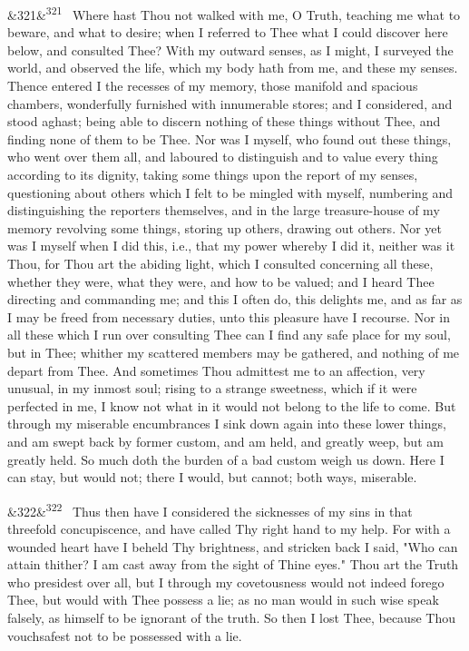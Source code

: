 \documentclass[12pt]{article}
\newcommand{\para}[1][]{\par\noindent\ifx&#1&\else\textsuperscript{\footnotesize #1}~\fi}
\begin{document}
\para[321] Where hast Thou not walked with me, O Truth, teaching me what to beware, and what to desire; when I referred to Thee what I could discover here below, and consulted Thee? With my outward senses, as I might, I surveyed the world, and observed the life, which my body hath from me, and these my senses. Thence entered I the recesses of my memory, those manifold and spacious chambers, wonderfully furnished with innumerable stores; and I considered, and stood aghast; being able to discern nothing of these things without Thee, and finding none of them to be Thee. Nor was I myself, who found out these things, who went over them all, and laboured to distinguish and to value every thing according to its dignity, taking some things upon the report of my senses, questioning about others which I felt to be mingled with myself, numbering and distinguishing the reporters themselves, and in the large treasure-house of my memory revolving some things, storing up others, drawing out others. Nor yet was I myself when I did this, i.e., that my power whereby I did it, neither was it Thou, for Thou art the abiding light, which I consulted concerning all these, whether they were, what they were, and how to be valued; and I heard Thee directing and commanding me; and this I often do, this delights me, and as far as I may be freed from necessary duties, unto this pleasure have I recourse. Nor in all these which I run over consulting Thee can I find any safe place for my soul, but in Thee; whither my scattered members may be gathered, and nothing of me depart from Thee. And sometimes Thou admittest me to an affection, very unusual, in my inmost soul; rising to a strange sweetness, which if it were perfected in me, I know not what in it would not belong to the life to come. But through my miserable encumbrances I sink down again into these lower things, and am swept back by former custom, and am held, and greatly weep, but am greatly held. So much doth the burden of a bad custom weigh us down. Here I can stay, but would not; there I would, but cannot; both ways, miserable.

\para[322] Thus then have I considered the sicknesses of my sins in that threefold concupiscence, and have called Thy right hand to my help. For with a wounded heart have I beheld Thy brightness, and stricken back I said, "Who can attain thither? I am cast away from the sight of Thine eyes." Thou art the Truth who presidest over all, but I through my covetousness would not indeed forego Thee, but would with Thee possess a lie; as no man would in such wise speak falsely, as himself to be ignorant of the truth. So then I lost Thee, because Thou vouchsafest not to be possessed with a lie.
\end{document}
